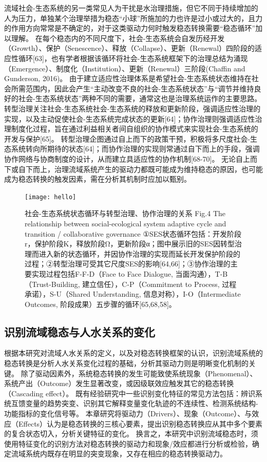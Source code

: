 流域社会-生态系统的另一类常见人为干扰是水治理措施，但它不同于持续增加的人为压力，单独某个治理举措为稳态“小球”所施加的力也许是过小或过大的，且力的作用方向常常是不确定的，对于这类驱动力何时触发稳态转换需要“稳态循环”加以理解。
在每个稳态内的不同尺度下，社会-生态系统会自发历经开发（Growth）、保护（Senescence）、释放（Collapse）、更新（Renewal）四阶段的适应性循环[63]，也有学者根据该循环将社会-生态系统框架下的治理总结为涌现（Emergence）、制度化（Institution）、更新（Renewal）三阶段(Chaffin and Gunderson, 2016)。
由于建立适应性治理体系是希望社会-生态系统状态维持在社会所需范围内，因此会产生“主动改变不良的社会-生态系统状态”与“调节并维持良好的社会-生态系统状态”两种不同的需要，通常这也是治理系统运作的主要思路。
转型治理关注社会-生态系统社会-生态系统的释放和更新阶段，强调适应性治理的实现，以及主动促使社会-生态系统完成状态的更新[64]；协作治理则强调适应性治理制度化过程，旨在通过利益相关者间自组织的协作模式来实现社会-生态系统的开发与保护[65]。
转型治理企图通过自上而下的政策干预，积极将多尺度社会-生态系统转向所期待的状态[64]；而协作治理的实现则常通过自下而上的手段，强调协作网络与协商制度的设计，从而建立具适应性的协作机制[68-70]。
无论自上而下或自下而上，治理流域系统产生的驱动力都既可能成为维持稳态的原因，也可能成为稳态转换的触发因素，需在分析其机制时应加以甄别。

\begin{figure}[htb] %
    \centering
    \texttt{[image: hello]}
    \caption[社会-生态系统状态循环]{社会-生态系统状态循环与转型治理、协作治理的关系
    Fig.4  The relationship between social-ecological system adaptive cycle and transition / collaborative governance
    ①SES状态循环包括：开发阶段r，保护阶段K，释放阶段Ω，更新阶段α；图中展示旧的SES因转型治理而进入新的状态循环，并因协作治理的实现而延长开发保护阶段的过程；②转型治理可受其它尺度SES的影响[64,66]；③协作治理的主要实现过程包括F-F-D（Face to Face Dialogue, 当面沟通），T-B（Trust-Building, 建立信任），C-P（Commitment to Process, 过程承诺），S-U（Shared Understanding, 信息对称），I-O（Intermediate Outcomes, 阶段成果）五步骤的循环[65,68,58]。}
    \label{fig:xfig0}
\end{figure}

\subsection{识别流域稳态与人水关系的变化}

根据本研究对流域人水关系的定义，以及对稳态转换框架的认识，识别流域系统的稳态转换是分析人水关系变化过程的基础，分析其驱动力则是明晰变化机制的关键。
除了驱动因素外，系统稳态转换的发生可能致使系统现象（Phenomenal）、系统产出（Outcome）发生显著改变，或因级联效应触发其它的稳态转换（Cascading effect）。
既有经验研究中一些识别变化特征的常见方法包括：辨识系统互馈变量的趋势突变、识别其它解释变量变化轨迹的不连续性、检测系统结构-功能指标的变化信号等。
本章研究将驱动力（Drivers）、现象（Outcome）、与效应（Effects）认为是稳态转换的三核心要素，提出识别稳态转换应从其中多个要素的复合状态切入，分析关键特征的变化。
换言之，本研究中识别流域稳态时，须使用特征变化的识别方法对稳态转换的驱动力和现象/效应都进行分析或检验，确定流域系统内既存在明显的突变现象，又存在相应的稳态转换驱动力。

